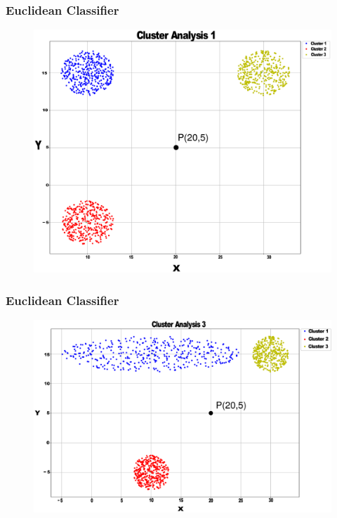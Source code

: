 \documentclass[aspectratio=10]{beamer} %
\begin{document}
\begin{frame}
  \frametitle{Euclidean Classifier}
  
    \begin{figure}[H]
    	
    	\includegraphics[scale=0.13]{Imagens/clusteranalise1.eps}
    \end{figure}
  
\end{frame}

\begin{frame}
\frametitle{Euclidean Classifier}

\begin{figure}[H]
	
	\includegraphics[scale=0.13]{Imagens/clusteranalise3.eps}
\end{figure}

\end{frame}
\end{document}
